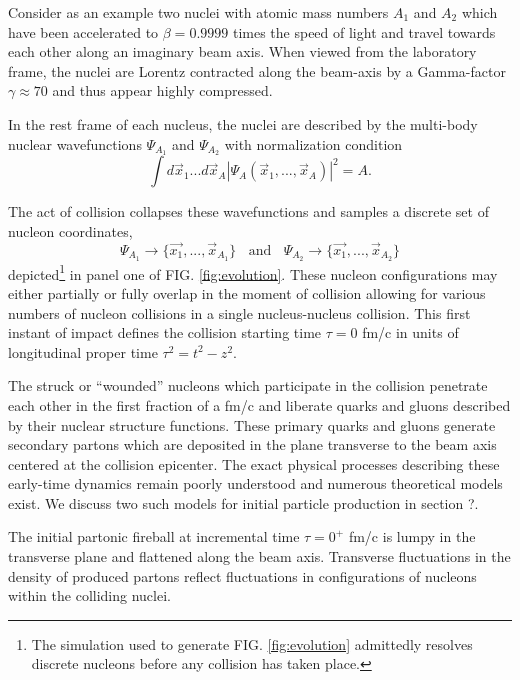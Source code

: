\documentclass[aps,prc,reprint,amsmath,nofootinbib]{revtex4-1}
\begin{document}
Consider as an example two nuclei with atomic mass numbers $A_1$ and $A_2$ which have been accelerated to $\beta=0.9999$ times the speed of light and travel towards
each other along an imaginary beam axis. When viewed from the laboratory frame, the nuclei are Lorentz contracted along the beam-axis by a Gamma-factor 
$\gamma \approx 70$ and thus appear highly compressed. 

In the rest frame of each nucleus, the nuclei are described by the multi-body nuclear wavefunctions $\Psi_{A_1}$ and $\Psi_{A_2}$ with normalization condition  
\begin{equation}
\int d\vec{x}_1 ... d\vec{x}_A \left | \Psi_A(\vec{x}_1,...,\vec{x}_A) \right|^2 = A.
\end{equation}

The act of collision collapses these wavefunctions and samples a discrete set of nucleon coordinates,
\begin{equation}
 \Psi_{A_1} \rightarrow \{\vec{x_1},...,\vec{x}_{A_1}\} ~~~~ \mbox{and} ~~~~ \Psi_{A_2} \rightarrow \{\vec{x_1},...,\vec{x}_{A_2}\}
\end{equation}
depicted\footnote{The simulation used to generate FIG. \ref{fig:evolution} admittedly resolves discrete nucleons before any collision has taken place.} in panel one 
of FIG. \ref{fig:evolution}. These nucleon configurations may either partially or fully overlap in the moment of collision allowing for various numbers of nucleon 
collisions in a single nucleus-nucleus collision. This first instant of impact defines the collision starting time $\tau=0$ fm/c in units of longitudinal proper time $\tau^2 = t^2-z^2$.

The struck or ``wounded'' nucleons which participate in the collision penetrate each other in the first fraction of a fm/c and liberate quarks and gluons described by 
their nuclear structure functions. These primary quarks and gluons generate secondary partons which are deposited in the plane transverse to the beam axis centered 
at the collision epicenter. The exact physical processes describing these early-time dynamics remain poorly understood and numerous theoretical models exist. We 
discuss two such models for initial particle production in section ?. 

The initial partonic fireball at incremental time $\tau=0^+$ fm/c is lumpy in the transverse plane and flattened along the beam axis. Transverse fluctuations in the 
density of produced partons reflect fluctuations in configurations of nucleons within the colliding nuclei. 
\end{document}
